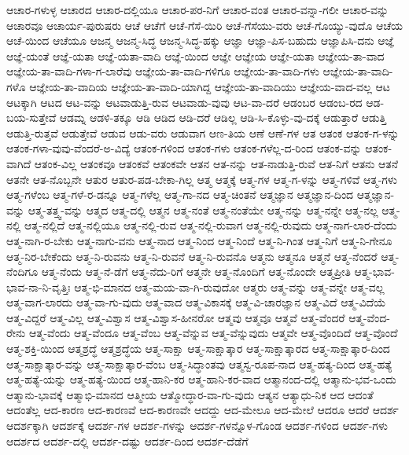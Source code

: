 {ಆಚಾರ-ಗಳುಳ್ಳ
ಆಚಾರದ
ಆಚಾರ-ದಲ್ಲಿಯೂ
ಆಚಾರ-ಪರ-ನಿಗೆ
ಆಚಾರ-ವಂತ
ಆಚಾರ-ವನ್ನಾ-ಗಲೀ
ಆಚಾರ-ವನ್ನು
ಆಚಾರವೂ
ಆಚಾರ್ಯ-ಪುರುಷರು
ಆಚೆ
ಆಚೆಗೆ
ಆಚೆ-ಗೆಸೆ-ಯಿರಿ
ಆಚೆ-ಗೆಸೆಯು-ವರು
ಆಚೆ-ಗೊಯ್ಯು-ವುದೊ
ಆಚೆಯ
ಆಚೆ-ಯಿಂದ
ಆಚೆಯೂ
ಆಜನ್ಮ
ಆಜನ್ಮ-ಸಿದ್ಧ
ಆಜನ್ಮ-ಸಿದ್ಧ-ಹಕ್ಕು
ಆಜ್ಞಾ
ಆಜ್ಞಾ-ಪಿಸ-ಬಹುದು
ಆಜ್ಞಾಪಿಸಿ-ದನು
ಆಜ್ಞೆ
ಆಜ್ಞೆ-ಯಂತೆ
ಆಜ್ಞೆ-ಯತಾ
ಆಜ್ಞೆ-ಯತಾ-ವಾದಿ
ಆಜ್ಞೆ-ಯಿಂದ
ಆಜ್ಞೇ
ಆಜ್ಞೇಯ
ಆಜ್ಞೇ-ಯತಾ
ಆಜ್ಞೇಯ-ತಾ-ವಾದ
ಆಜ್ಞೇಯ-ತಾ-ವಾದಿ-ಗಳಾ-ಗ-ಲಾರೆವು
ಆಜ್ಞೇಯ-ತಾ-ವಾದಿ-ಗಳಿಗೂ
ಆಜ್ಞೇಯ-ತಾ-ವಾದಿ-ಗಳು
ಆಜ್ಞೇಯ-ತಾ-ವಾದಿ-ಗಳೊ
ಆಜ್ಞೇಯ-ತಾ-ವಾದಿಯ
ಆಜ್ಞೇಯ-ತಾ-ವಾದಿ-ಯಾಗಿದ್ದ
ಆಜ್ಞೇಯ-ತಾ-ವಾದಿಯು
ಆಜ್ಞೇಯ-ವಾದ-ವಲ್ಲ
ಆಟ
ಆಟಕ್ಕಾಗಿ
ಆಟದ
ಆಟ-ವನ್ನು
ಆಟವಾಡುತ್ತಿ-ರುವ
ಆಟವಾಡು-ವುವು
ಆಟ-ವಾ-ದರೆ
ಆಡಂಬರ
ಆಡಂಬ-ರದ
ಆಡ-ಬಯ-ಸುತ್ತೇವೆ
ಆಡಮ್ನ
ಆಡಳಿ-ತಕ್ಕೂ
ಆಡಿ
ಆಡಿದ
ಆಡಿ-ದರೆ
ಆಡಿಲ್ಲ
ಆಡಿ-ಸಿ-ಕೊಳ್ಳು-ವು-ದಕ್ಕೆ
ಆಡುತ್ತಾರೆ
ಆಡುತ್ತಿ
ಆಡುತ್ತಿ-ರುತ್ತವೆ
ಆಡುತ್ತೇವೆ
ಆಡುವ
ಆಡು-ವರು
ಆಡುವಾಗ
ಆಣ-ತಿಯ
ಆಣೆ
ಆಣೆ-ಗಳ
ಆತ
ಆತಂಕ
ಆತಂಕ-ಗ-ಳನ್ನು
ಆತಂಕ-ಗಳಾ-ವುವು-ವೆಂದರೆ-ಅ-ವಿದ್ಯೆ
ಆತಂಕ-ಗಳಿಂದ
ಆತಂಕ-ಗಳು
ಆತಂಕ-ಗಳೆಲ್ಲ-ದ-ರಿಂದ
ಆತಂಕ-ವನ್ನು
ಆತಂಕ-ವಾಗಿದೆ
ಆತಂಕ-ವಿಲ್ಲ
ಆತಂಕವೂ
ಆತಂಕವೆ
ಆತಂಕವೇ
ಆತನ
ಆತ-ನನ್ನು
ಆತ-ನಾಡುತ್ತಿ-ರುವೆ
ಆತ-ನಿಗೆ
ಆತನು
ಆತನೆ
ಆತನೇ
ಆತ-ನೊಬ್ಬನೇ
ಆತುರ
ಆತುರ-ಪಡ-ಬೇಕಾ-ಗಿಲ್ಲ
ಆತ್ಮ
ಆತ್ಮಕ್ಕೆ
ಆತ್ಮ-ಗಳ
ಆತ್ಮ-ಗ-ಳನ್ನು
ಆತ್ಮ-ಗಳಿವೆ
ಆತ್ಮ-ಗಳು
ಆತ್ಮ-ಗಳೆಂಬ
ಆತ್ಮ-ಗಳೆ-ರ-ಡನ್ನೂ
ಆತ್ಮ-ಗಳೆಲ್ಲ
ಆತ್ಮ-ಗಾ-ನದ
ಆತ್ಮ-ಚಿಂತನೆ
ಆತ್ಮಜ್ಞಾನ
ಆತ್ಮಜ್ಞಾನ-ದಿಂದ
ಆತ್ಮಜ್ಞಾನ-ವನ್ನು
ಆತ್ಮ-ತತ್ತ್ವ-ವನ್ನು
ಆತ್ಮದ
ಆತ್ಮ-ದಲ್ಲಿ
ಆತ್ಮನ
ಆತ್ಮ-ನಂತೆ
ಆತ್ಮ-ನಂತೆಯೇ
ಆತ್ಮ-ನನ್ನು
ಆತ್ಮ-ನನ್ನೇ
ಆತ್ಮ-ನಲ್ಲ
ಆತ್ಮ-ನಲ್ಲಿ
ಆತ್ಮ-ನಲ್ಲಿದೆ
ಆತ್ಮ-ನಲ್ಲಿಯೂ
ಆತ್ಮ-ನಲ್ಲಿ-ರುವ
ಆತ್ಮ-ನಲ್ಲಿ-ರುವಾಗ
ಆತ್ಮ-ನಲ್ಲಿ-ರುವುದು
ಆತ್ಮ-ನಾಗ-ಲಾರ-ದೆಂದು
ಆತ್ಮ-ನಾಗಿ-ರ-ಬೇಕು
ಆತ್ಮ-ನಾಗು-ವನು
ಆತ್ಮ-ನಾದ
ಆತ್ಮ-ನಿಂದ
ಆತ್ಮ-ನಿಂದೆ
ಆತ್ಮ-ನಿ-ಗಿಂತ
ಆತ್ಮ-ನಿಗೆ
ಆತ್ಮ-ನಿ-ಗೇನೂ
ಆತ್ಮ-ನಿರ-ಬೇಕೆಂದು
ಆತ್ಮ-ನಿ-ರುವನು
ಆತ್ಮ-ನಿ-ರುವನೆ
ಆತ್ಮ-ನಿ-ರುವನೊ
ಆತ್ಮನು
ಆತ್ಮನೂ
ಆತ್ಮನೆ
ಆತ್ಮ-ನೆಂದರೆ
ಆತ್ಮ-ನೆಂದಿಗೂ
ಆತ್ಮ-ನೆಂದು
ಆತ್ಮ-ನೆ-ಡೆಗೆ
ಆತ್ಮ-ನೆದು-ರಿಗೆ
ಆತ್ಮನೇ
ಆತ್ಮ-ನೊಂದಿಗೆ
ಆತ್ಮ-ನೊಂದೇ
ಆತ್ಮಪ್ರೀತಿ
ಆತ್ಮ-ಭಾವ-ಭಾವ-ನಾ-ನಿ-ವೃತ್ತಿಃ
ಆತ್ಮ-ಭಿ-ಮಾನದ
ಆತ್ಮ-ಮಯ-ವಾ-ಗಿ-ರುವುದೋ
ಆತ್ಮರು
ಆತ್ಮ-ವನ್ನು
ಆತ್ಮ-ವನ್ನೇ
ಆತ್ಮ-ವಲ್ಲ
ಆತ್ಮ-ವಾಗ-ಲಾರದು
ಆತ್ಮ-ವಾ-ಗು-ವುದು
ಆತ್ಮ-ವಾದ
ಆತ್ಮ-ವಿಕಾಸಕ್ಕೆ
ಆತ್ಮ-ವಿ-ಚಾರಜ್ಞಾನ
ಆತ್ಮ-ವಿದೆ
ಆತ್ಮ-ವಿದೆಯೆ
ಆತ್ಮ-ವಿದ್ದರೆ
ಆತ್ಮ-ವಿಲ್ಲ
ಆತ್ಮ-ವಿಶ್ವಾಸ
ಆತ್ಮ-ವಿಶ್ವಾಸ-ಹೀನರೋ
ಆತ್ಮವು
ಆತ್ಮವೂ
ಆತ್ಮವೆ
ಆತ್ಮ-ವೆಂದರೆ
ಆತ್ಮ-ವೆಂದ-ರೇನು
ಆತ್ಮ-ವೆಂದು
ಆತ್ಮ-ವೆಂದೂ
ಆತ್ಮ-ವೆಂಬ
ಆತ್ಮ-ವೆನ್ನುವ
ಆತ್ಮ-ವೆನ್ನುವುದು
ಆತ್ಮವೇ
ಆತ್ಮ-ವೊಂದಿದೆ
ಆತ್ಮ-ವೊಂದೆ
ಆತ್ಮ-ಶಕ್ತಿ-ಯಿಂದ
ಆತ್ಮಶ್ರದ್ಧೆ
ಆತ್ಮಶ್ರದ್ಧೆಯ
ಆತ್ಮ-ಸಾಕ್ಷಾ
ಆತ್ಮ-ಸಾಕ್ಷಾತ್ಕಾರ
ಆತ್ಮ-ಸಾಕ್ಷಾತ್ಕಾರದ
ಆತ್ಮ-ಸಾಕ್ಷಾತ್ಕಾರ-ದಿಂದ
ಆತ್ಮ-ಸಾಕ್ಷಾತ್ಕಾರ-ವನ್ನು
ಆತ್ಮ-ಸಾಕ್ಷಾತ್ಕಾರ-ವೆಂಬ
ಆತ್ಮ-ಸಿದ್ಧಾಂತವು
ಆತ್ಮಸ್ವ-ರೂಪ-ನಾದ
ಆತ್ಮ-ಹತ್ಯ-ದಿಂದ
ಆತ್ಮ-ಹತ್ಯೆ
ಆತ್ಮ-ಹತ್ಯೆ-ಯನ್ನು
ಆತ್ಮ-ಹತ್ಯೆ-ಯಿಂದ
ಆತ್ಮ-ಹಾನಿ-ಕರ
ಆತ್ಮ-ಹಾನಿ-ಕರ-ವಾದ
ಆತ್ಮಾನಂದ-ದಲ್ಲಿ
ಆತ್ಮಾನು-ಭವ-ಒಂದು
ಆತ್ಮಾನು-ಭಾವಕ್ಕೆ
ಆತ್ಮಾಭಿ-ಮಾನದ
ಆತ್ಮೀಯ
ಆತ್ಮೋದ್ಧಾರ-ವಾ-ಗು-ವುದು
ಆತ್ಯನ
ಆತ್ಯಾಧು-ನಿಕ
ಆದ
ಆದಂತೆ
ಆದಂತೆಲ್ಲ
ಆದ-ಕಾರಣ
ಆದ-ಕಾರಣವೆ
ಆದ-ಕಾರಣವೇ
ಆದದ್ದು
ಆದ-ಮೇಲೂ
ಆದ-ಮೇಲೆ
ಆದರೂ
ಆದರೆ
ಆದರ್ಶ
ಆದರ್ಶಕ್ಕಾಗಿ
ಆದರ್ಶಕ್ಕೆ
ಆದರ್ಶ-ಗಳ
ಆದರ್ಶ-ಗಳನ್ನು
ಆದರ್ಶ-ಗಳನ್ನೊಳ-ಗೊಂಡ
ಆದರ್ಶ-ಗಳಿಂದ
ಆದರ್ಶ-ಗಳು
ಆದರ್ಶದ
ಆದರ್ಶ-ದಲ್ಲಿ
ಆದರ್ಶ-ದಷ್ಟು
ಆದರ್ಶ-ದಿಂದ
ಆದರ್ಶ-ದೆಡೆಗೆ
}
